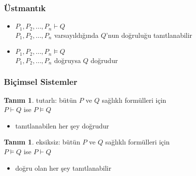 \documentclass[dvipsnames]{beamer}
\theoremstyle{definition}
\newtheorem{tanim}[theorem]{Tanım}
\theoremstyle{example}
\theoremstyle{plain}
\begin{document}
\begin{frame}
  \frametitle{Üstmantık}

  \begin{itemize}
    \item $P_1,P_2,\dots,P_n \vdash Q$\\
      $P_1,P_2,\dots,P_n$ varsayıldığında $Q$'nun doğruluğu tanıtlanabilir

    \pause
    \medskip
    \item $P_1,P_2,\dots,P_n \vDash Q$\\
      $P_1,P_2,\dots,P_n$ doğruysa $Q$ doğrudur
  \end{itemize}
\end{frame}

\begin{frame}
  \frametitle{Biçimsel Sistemler}

  \begin{tanim}
    \alert{tutarlı}: bütün $P$ ve $Q$ sağlıklı formülleri için\\
      $P \vdash Q$ ise $P \vDash Q$
    \begin{itemize}
      \item tanıtlanabilen her şey doğrudur
    \end{itemize}
  \end{tanim}

  \pause
  \begin{tanim}
    \alert{eksiksiz}: bütün $P$ ve $Q$ sağlıklı formülleri için\\
      $P \vDash Q$ ise $P \vdash Q$
    \begin{itemize}
      \item doğru olan her şey tanıtlanabilir
    \end{itemize}
  \end{tanim}
\end{frame}
\end{document}

